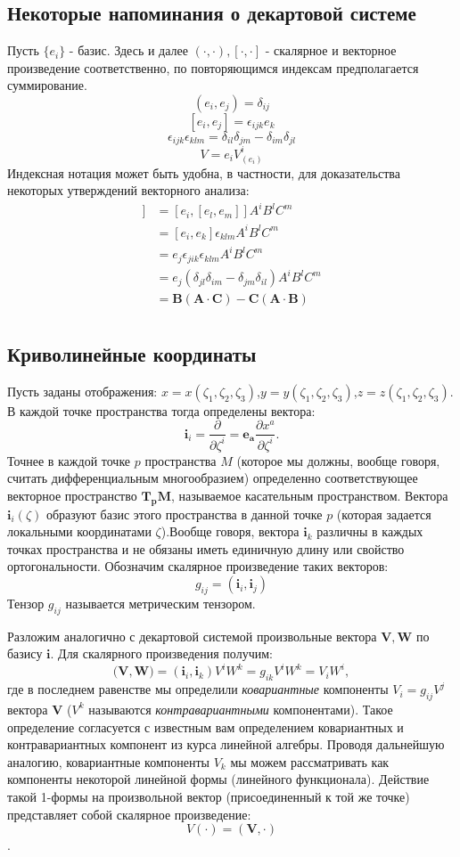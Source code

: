 \documentclass{article}
\begin{document}
\subsection*{Некоторые напоминания о декартовой системе} Пусть $\{e_i\}$ - базис. Здесь и далее $(\cdot, \cdot), [\cdot, \cdot]$ - скалярное и векторное произведение соответственно, по повторяющимся индексам предполагается суммирование.
$$(e_i, e_j)=\delta_{ij}$$
$$[e_i, e_j] = \epsilon_{ijk}e_k$$
$$\epsilon_{ijk}\epsilon_{klm} = \delta_{il}\delta_{jm} - \delta_{im}\delta_{jl}$$
$$V=e_i V^i_{(e_i)}$$
Индексная нотация может быть удобна, в частности, для доказательства некоторых утверждений векторного анализа:
\begin{align*}
    [\mathbf{A}, [\mathbf{B},\mathbf{C}]] &= [e_i, [e_l, e_m]] A^i B^l C^m\\
    &= [e_i, e_k] \epsilon_{klm} A^i B^l C^m \\
    &= e_j \epsilon_{jik}\epsilon_{klm} A^i B^l C^m \\
    &= e_j (\delta_{jl}\delta_{im} - \delta_{jm}\delta_{il}) A^i B^l C^m \\
    &= \mathbf{B} (\mathbf{A}\cdot \mathbf{C}) - \mathbf{C} (\mathbf{A}\cdot \mathbf{B})\\
\end{align*}
\subsection*{Криволинейные координаты}
Пусть заданы отображения: $x = x(\zeta_1, \zeta_2, \zeta_3)$,$y = y(\zeta_1, \zeta_2, \zeta_3)$,$z = z(\zeta_1, \zeta_2, \zeta_3)$.
В каждой точке пространства тогда определены вектора:
$$\mathbf{i}_i = \frac{\partial}{\partial \zeta^i} = \mathbf{e_a} \frac{\partial x^a}{\partial \zeta^i}.$$
Точнее в каждой точке $p$ пространства $M$ (которое мы должны, вообще говоря, считать дифференциальным многообразием) определенно соответствующее векторное пространство $\mathbf{T_p M}$, называемое касательным пространством. Вектора $\mathbf{i}_i (\zeta)$ образуют базис этого пространства в данной точке $p$ (которая задается локальными координатами $\zeta$).Вообще говоря, вектора $\mathbf{i}_k$ различны в каждых точках пространства и не обязаны иметь единичную длину или свойство ортогональности. Обозначим скалярное произведение таких векторов:
$$g_{ij} = (\mathbf{i}_i, \mathbf{i}_j)$$
Тензор $g_{ij}$ называется метрическим тензором.

Разложим аналогично с декартовой системой произвольные вектора $\mathbf{V,W}$ по базису $\mathbf{i}$. Для скалярного произведения получим:
$$(\mathbf{V,W)} = (\mathbf{i}_i, \mathbf{i}_k) V^i W^k = g_{ik} V^i W^k = V_i W^i,$$
где в последнем равенстве мы определили \textit{ковариантные} компоненты $V_i = g_{ij} V^j$ вектора $\mathbf{V}$ ($V^k$ называются \textit{контравариантными} компонентами). Такое определение согласуется с известным вам определением ковариантных и контравариантных компонент из курса линейной алгебры. Проводя дальнейшую аналогию, ковариантные компоненты $V_k$ мы можем рассматривать как  компоненты некоторой линейной формы (линейного функционала). Действие такой 1-формы на произвольной вектор (присоединенный к той же точке) представляет собой скалярное произведение:
$${V}(\cdot) = (\mathbf{V}, \cdot)$$.
\end{document}
